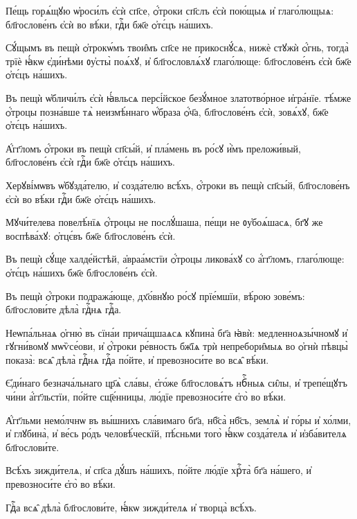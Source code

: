 \hKv Пе́щь горѧ́щꙋю ѡ҆роси́лъ є҆сѝ сп҃се, ѻ҆́троки сп҃слъ  є҆сѝ пою́щыѧ и҆ глаго́лющыѧ: бл҃гослове́нъ є҆сѝ во  вѣ́ки, гдⷭ҇и бж҃е ѻ҆тє́цъ на́шихъ. 

\hKv Сꙋ́щымъ въ пещѝ ѻ҆трокѡ́мъ твои̑мъ сп҃се не прикоснꙋ́сѧ,  нижѐ стꙋжѝ ѻ҆́гнь, тогда̀  трїѐ  ꙗ҆́кѡ є҆ди́нѣми ᲂу҆сты̀ поѧ́хꙋ, и҆ бл҃гословлѧ́хꙋ  глаго́люще: бл҃гослове́нъ є҆сѝ бж҃е ѻ҆тє́цъ на́шихъ. 

\hKv Въ пещѝ ѡ҆бличи́лъ є҆сѝ ꙗ҆́вльсѧ персі́йское безꙋ́мное  златотво́рное и҆гра́нїе. тѣ́мже ѻ҆́троцы позна́вше тѧ̀  неизмѣ́ннаго ѡ҆́браза ѻ҆́ч҃а, бл҃гослове́нъ є҆сѝ,  зовѧ́хꙋ, бж҃е ѻ҆тє́цъ на́шихъ. 

\hKv А҆́гг҃ломъ ѻ҆́троки въ пещѝ сп҃сы́й, и҆ пла́мень въ ро́сꙋ  и҆̀мъ преложи́вый, бл҃гослове́нъ є҆сѝ гдⷭ҇и бж҃е ѻ҆тє́цъ  на́шихъ. 

\hKv Херꙋві́мѡвъ ѡ҆бꙋзда́телю, и҆ созда́телю всѣ́хъ, ѻ҆́троки  въ пещѝ сп҃сы́й, бл҃гослове́нъ є҆сѝ во вѣ́ки гдⷭ҇и бж҃е  ѻ҆тє́цъ на́шихъ. 

\hKv Мꙋчи́телева повелѣ́нїѧ ѻ҆́троцы не послꙋ́шаша, пе́щи не  ᲂу҆боѧ́шасѧ, бг҃ꙋ же воспѣва́хꙋ: ѻ҆тцє́въ бж҃е  бл҃гослове́нъ є҆сѝ. 

\hKv Въ пещѝ сꙋ́ще халде́йстѣй, а҆враа́мстїи ѻ҆́троцы  ликова́хꙋ со а҆́гг҃ломъ, глаго́люще: ѻ҆тє́цъ на́шихъ бж҃е  бл҃гослове́нъ є҆сѝ.  
%

\hKv Въ пещѝ ѻ҆́троки подража́юще, дх҃о́внꙋю ро́сꙋ прїе́мшїи,  вѣ́рою зове́мъ: бл҃гослови́те дѣла̀ гдⷭ҇нѧ гдⷭ҇а. 
%

\hKv Неѡпа́льнаѧ ѻ҆гню̀ въ сїна́и  прича́щшаѧсѧ кꙋпина̀ бг҃а ꙗ҆вѝ: медленноѧзы́чномꙋ и҆  гꙋгни́вомꙋ мѡѷсе́ови, и҆ ѻ҆́троки ре́вность бж҃їѧ трѝ  непребори̑мыѧ во ѻ҆гнѝ пѣвцы̀ показа̀: всѧ̑ дѣла̀ гдⷭ҇нѧ  гдⷭ҇а по́йте, и҆ превозноси́те во всѧ̑ вѣ́ки. 
%

\hKv Є҆ди́наго безнача́льнаго цр҃ѧ̀ сла́вы, є҆го́же  бл҃гословѧ́тъ нбⷭ҇ныѧ си̑лы, и҆ трепе́щꙋтъ чи́ни  а҆́гг҃льстїи, по́йте сщ҃е́нницы, лю́дїе превозноси́те є҆го̀  во вѣ́ки. 

\hKv А҆́гг҃льми немо́лчнѡ въ вы́шнихъ сла́вимаго бг҃а, нб҃са̀  нб҃съ, землѧ̀ и҆ го́ры и҆ хо́лми, и҆ глꙋбина̀, и҆ ве́сь  ро́дъ человѣ́ческїй, пѣ́сньми того̀ ꙗ҆́кѡ созда́телѧ и҆  и҆зба́вителѧ бл҃гослови́те.  

\hKv Всѣ́хъ зижди́телѧ, и҆ сп҃са дꙋ́шъ на́шихъ, по́йте лю́дїе  хрⷭ҇та̀ бг҃а на́шего, и҆ превозноси́те є҆го̀ во вѣ́ки. 

\hKv Гдⷭ҇а всѧ̑ дѣла̀ бл҃гослови́те, ꙗ҆́кѡ зижди́телѧ и҆  творца̀ всѣ́хъ. 

